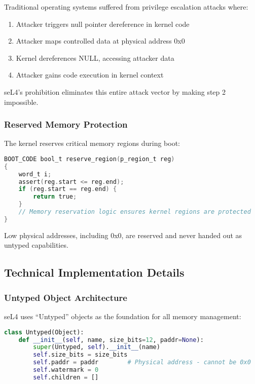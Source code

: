 \documentclass[11pt,a4paper]{article}
\begin{document}
Traditional operating systems suffered from privilege escalation attacks where:
\begin{enumerate}
    \item Attacker triggers null pointer dereference in kernel code
    \item Attacker maps controlled data at physical address 0x0
    \item Kernel dereferences NULL, accessing attacker data
    \item Attacker gains code execution in kernel context
\end{enumerate}

seL4's prohibition eliminates this entire attack vector by making step 2 impossible.

\subsubsection{Reserved Memory Protection}

The kernel reserves critical memory regions during boot:

\begin{lstlisting}[language=C,caption=seL4 Kernel Boot Memory Reservation]
BOOT_CODE bool_t reserve_region(p_region_t reg)
{
    word_t i;
    assert(reg.start <= reg.end);
    if (reg.start == reg.end) {
        return true;
    }
    // Memory reservation logic ensures kernel regions are protected
}
\end{lstlisting}

Low physical addresses, including 0x0, are reserved and never handed out as untyped capabilities.

\subsection{Technical Implementation Details}

\subsubsection{Untyped Object Architecture}

seL4 uses ``Untyped'' objects as the foundation for all memory management:

\begin{lstlisting}[language=Python,caption=Untyped Object Definition]
class Untyped(Object):
    def __init__(self, name, size_bits=12, paddr=None):
        super(Untyped, self).__init__(name)
        self.size_bits = size_bits
        self.paddr = paddr        # Physical address - cannot be 0x0
        self.watermark = 0
        self.children = []
\end{lstlisting}
\end{document}
